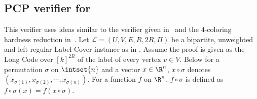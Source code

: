 %
%
%
%
%
%
%
%
%
%
%
%
%
%
%
%
%
%
%
%
%
%
%
%
%
%
%
%
%
%
%
%
%
%
%
%
%
%
%
%
%


\vspace{-1ex}
\subsection{PCP verifier for }
%
This verifier uses ideas similar to the  verifier given in~\cite{KKMO} and the $4$-coloring hardness reduction in~\cite{DMR}. Let $\mathcal{L} = (U,V,E,R,2 R,\Pi)$ be a 
bipartite, unweighted and left regular Label-Cover instance as in
. Assume the proof is given as the Long
Code over $[k]^{2 R}$ of the label of every vertex $v \in V$. Below
for a permutation $\sigma$ on $\intset{n}$ and a vector $x \in \R^n$, $x\circ \sigma$ denotes $(x_{\sigma(1)},x_{\sigma(2)},\cdots,x_{\sigma(n)})$. For a function $f$ on $\R^n$, $f \circ \sigma$ is defined as $f \circ \sigma(x) = f(x \circ \sigma)$.

%
%

%
%

